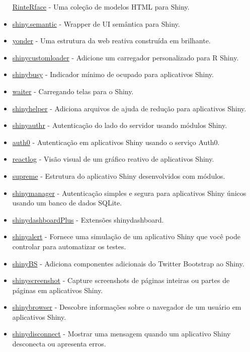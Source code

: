 \documentclass[
]{book}
\begin{document}
\begin{itemize}
  \href{https://rinterface.com/}{RinteRface} - Uma coleção de modelos HTML para Shiny.
\item
  \href{https://appsilon.github.io/shiny.semantic/}{shiny.semantic} - Wrapper de UI semântica para Shiny.
\item
  \href{https://nteetor.github.io/yonder/}{yonder} - Uma estrutura da web reativa construída em brilhante.
\item
  \href{https://emitanaka.org/shinycustomloader/}{shinycustomloader} - Adicione um carregador personalizado para R Shiny.
\item
  \href{https://dreamrs.github.io/shinybusy/}{shinybusy} - Indicador mínimo de ocupado para aplicativos Shiny.
\item
  \href{https://waiter.john-coene.com/\#/}{waiter} - Carregando telas para o Shiny.
\item
  \href{https://github.com/cwthom/shinyhelper}{shinyhelper} - Adiciona arquivos de ajuda de redução para aplicativos Shiny.
\item
  \href{https://paul.rbind.io/shinyauthr/}{shinyauthr} - Autenticação do lado do servidor usando módulos Shiny.
\item
  \href{https://curso-r.github.io/auth0/}{auth0} - Autenticação em aplicativos Shiny usando o serviço Auth0.
\item
  \href{https://rstudio.github.io/reactlog/}{reactlog} - Visão visual de um gráfico reativo de aplicativos Shiny.
\item
  \href{https://strboul.github.io/supreme/}{supreme} - Estrutura do aplicativo Shiny desenvolvidos com módulos.
\item
  \href{https://datastorm-open.github.io/shinymanager/}{shinymanager} - Autenticação simples e segura para aplicativos Shiny únicos usando um banco de dados SQLite.
\item
  \href{https://rinterface.github.io/shinydashboardPlus/}{shinydashboardPlus} - Extensões shinydashboard.
\item
  \href{https://github.com/daattali/shinyalert}{shinyalert} - Fornece uma simulação de um aplicativo Shiny que você pode controlar para automatizar os testes.
\item
  \href{https://ebailey78.github.io/shinyBS/}{shinyBS} - Adiciona componentes adicionais do Twitter Bootstrap ao Shiny.
\item
  \href{https://github.com/daattali/shinyscreenshot}{shinyscreenshot} - Capture screenshots de páginas inteiras ou partes de páginas em aplicativos Shiny.
\item
  \href{https://github.com/daattali/shinybrowser}{shinybrowser} - Descobre informações sobre o navegador de um usuário em aplicativos Shiny.
\item
  \href{https://github.com/daattali/shinydisconnect}{shinydisconnect} - Mostrar uma mensagem quando um aplicativo Shiny desconecta ou apresenta erros.
\end{itemize}
\end{document}
